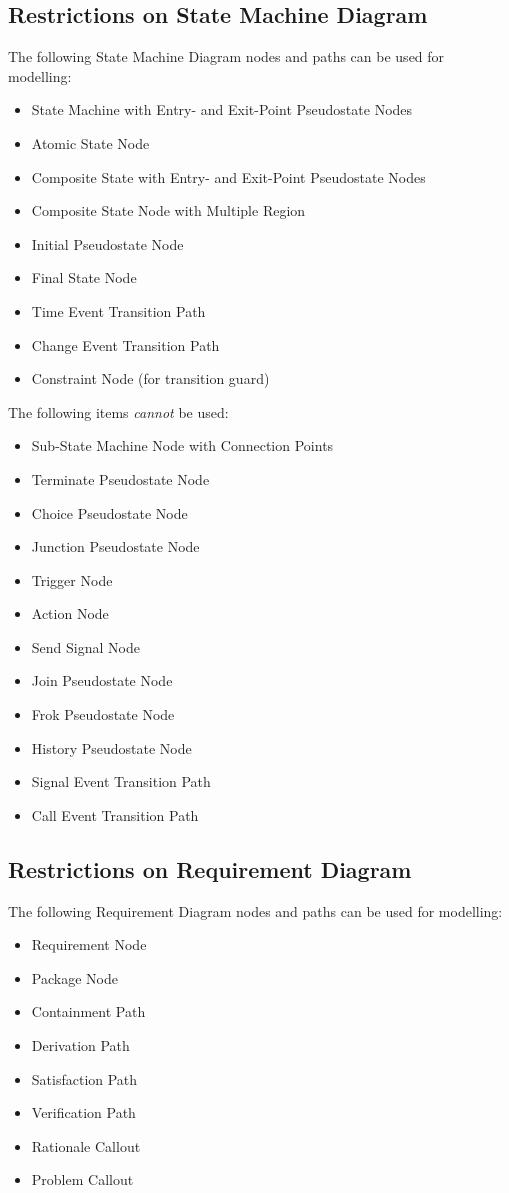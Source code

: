 \subsection{Restrictions on State Machine Diagram}

The following State Machine Diagram nodes and paths can be used for
modelling:
\begin{itemize}
\item State Machine with Entry- and Exit-Point Pseudostate Nodes
\item Atomic State Node
\item Composite State with Entry- and Exit-Point Pseudostate Nodes
\item Composite State Node with Multiple Region
\item Initial Pseudostate Node
\item Final State Node
\item Time Event Transition Path
\item Change Event Transition Path
\item Constraint Node (for transition guard)
\end{itemize}

The following items \emph{cannot} be used:
\begin{itemize}
\item Sub-State Machine Node with Connection Points
\item Terminate Pseudostate Node
\item Choice Pseudostate Node
\item Junction Pseudostate Node
\item Trigger Node
\item Action Node
\item Send Signal Node
\item Join Pseudostate Node
\item Frok Pseudostate Node
\item History Pseudostate Node
\item Signal Event Transition Path
\item Call Event Transition Path
\end{itemize}

\subsection{Restrictions on Requirement Diagram}

The following Requirement Diagram nodes and paths can be used for
modelling:
\begin{itemize}
\item Requirement Node
\item Package Node
\item Containment Path
\item Derivation Path
\item Satisfaction Path
\item Verification Path
\item Rationale Callout
\item Problem Callout
\end{itemize}


